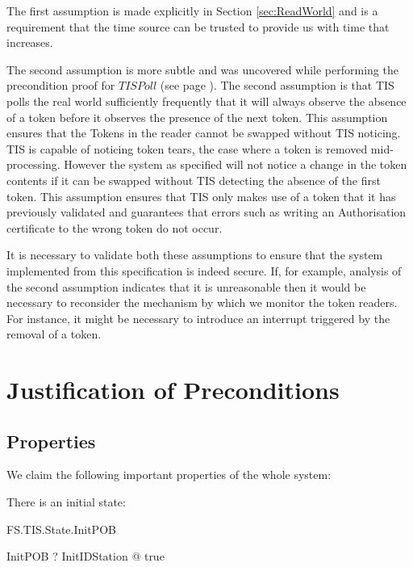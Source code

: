 The first assumption is made explicitly in Section
\ref{sec:ReadWorld} and is a requirement that the 
time source can be trusted to provide us with time that increases.

The second assumption is more subtle and was uncovered while
performing the precondition proof for $TISPoll$ (see page
\pageref{sec:PollPre}). The second assumption
is that TIS polls the real world sufficiently frequently that it will
always observe the absence of a token before it observes the presence
of the next token. This assumption ensures that the Tokens in the
reader cannot be swapped without TIS noticing. TIS is capable of
noticing token tears, the case where a token is removed mid-processing.
However the system as specified will not notice a change in the token
contents if it can be swapped without TIS detecting the absence of the
first token. This assumption ensures that TIS only makes use of a
token that it has previously validated and guarantees that errors such
as writing an Authorisation certificate to the wrong token do not occur.

It is necessary to validate both these assumptions to ensure that the 
system implemented from this specification is indeed secure. 
If, for example, analysis of the second assumption indicates that 
it is unreasonable then 
it would be necessary to reconsider the mechanism by which we monitor 
the token readers. For instance, it might be necessary to introduce an 
interrupt triggered by the removal of a token.%
\chapter{Justification of Preconditions}
\label{sec:Pre}

\section{Properties}
We claim the following important properties of the whole system:

There is an initial state:

\begin{Zpobtrace}{FS.TIS.State.InitPOB}
\begin{theorem}
InitPOB \vdash? \exists InitIDStation @ true
\end{theorem}
\end{Zpobtrace}

